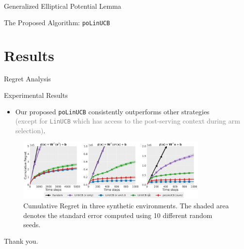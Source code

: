 \documentclass[10pt, xcolor=x11names,compress]{beamer}
\begin{document}
\begin{frame}{Generalized Elliptical Potential Lemma}

\end{frame}

\begin{frame}{The Proposed Algorithm: \texttt{poLinUCB}}

\end{frame}


\section{Results}
\begin{frame}{Regret Analysis}

\end{frame}

\begin{frame}{Experimental Results}

\begin{itemize}
    \item  Our proposed \texttt{poLinUCB} consistently outperforms other strategies\\\textcolor{gray}{{\footnotesize (except for \texttt{LinUCB} which has access to the post-serving context during arm selection)}}.
\end{itemize}

\begin{figure}[h]
    \centering
    \includegraphics[width=0.85\textwidth]{figs/synthetic-comparisons.pdf}
    \vspace{-0.2cm}
    \caption{{\small Cumulative Regret in three synthetic environments. The shaded area denotes the standard error computed using 10 different random seeds.}}
    \label{fig:synthetic-experiments}
\end{figure}

\end{frame}

\begin{frame}
 \begin{center}
		{\Huge Thank you.}
	\end{center}
\end{frame}
\end{document}
